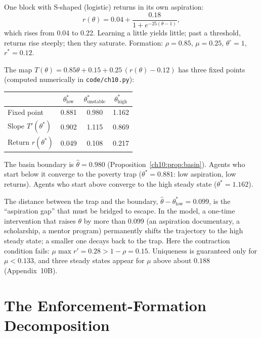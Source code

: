 \documentclass[../structural_economics_book.tex]{subfiles}
\begin{document}
\begin{example}\label{ch10:ex:trap}
One block with S-shaped (logistic) returns in its own aspiration:
\[
r(\theta) = 0.04 + \frac{0.18}{1 + e^{-25(\theta - 1)}},
\]
which rises from 0.04 to 0.22. Learning a little yields little; past a threshold, returns rise steeply; then they saturate. Formation: $\rho = 0.85$, $\mu = 0.25$, $\theta^{\circ} = 1$, $r^* = 0.12$.

The map $T(\theta) = 0.85\theta + 0.15 + 0.25\,(r(\theta) - 0.12)$ has three fixed points (computed numerically in \texttt{code/ch10.py}):
\begin{center}
\begin{tabular}{lccc}
\toprule
& $\theta^*_{\text{low}}$ & $\theta^*_{\text{unstable}}$ & $\theta^*_{\text{high}}$ \\
\midrule
Fixed point & 0.881 & 0.980 & 1.162 \\
Slope $T'(\theta^*)$ & 0.902 & 1.115 & 0.869 \\
Return $r(\theta^*)$ & 0.049 & 0.108 & 0.217 \\
\bottomrule
\end{tabular}
\end{center}

The basin boundary is $\hat{\theta} = 0.980$ (Proposition~\ref{ch10:prop:basin}). Agents who start below it converge to the poverty trap ($\theta^* = 0.881$: low aspiration, low returns). Agents who start above converge to the high steady state ($\theta^* = 1.162$).

The distance between the trap and the boundary, $\hat{\theta} - \theta^*_{\text{low}} = 0.099$, is the ``aspiration gap'' that must be bridged to escape. In the model, a one-time intervention that raises $\theta$ by more than 0.099 (an aspiration documentary, a scholarship, a mentor program) permanently shifts the trajectory to the high steady state; a smaller one decays back to the trap. Here the contraction condition fails: $\mu \max r' = 0.28 > 1 - \rho = 0.15$. Uniqueness is guaranteed only for $\mu < 0.133$, and three steady states appear for $\mu$ above about $0.188$ (Appendix~10B).
\end{example}


\section{The Enforcement-Formation Decomposition}
\label{ch10:sec:decomposition}
\end{document}
